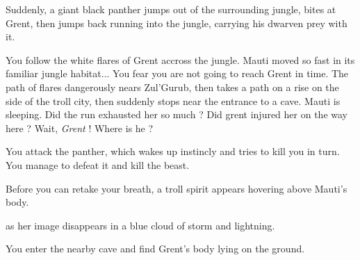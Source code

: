 
Suddenly, a giant black panther jumps out of the surrounding jungle, bites at Grent, then jumps back running into the jungle, carrying his dwarven prey with it.




You follow the white flares of Grent accross the jungle. Mauti moved so fast in its familiar jungle habitat... You fear you are not going to reach Grent in time. The path of flares dangerously nears Zul'Gurub, then takes a path on a rise on the side of the troll city, then suddenly stops near the entrance to a cave. Mauti is sleeping. Did the run exhausted her so much ? Did grent injured her on the way here ? Wait, \textit{Grent} ! Where is he ?



You attack the panther, which wakes up instincly and tries to kill you in turn. You manage to defeat it and kill the beast.

Before you can retake your breath, a troll spirit appears hovering above Mauti's body.





as her image disappears in a blue cloud of storm and lightning.




You enter the nearby cave and find Grent's body lying on the ground.

